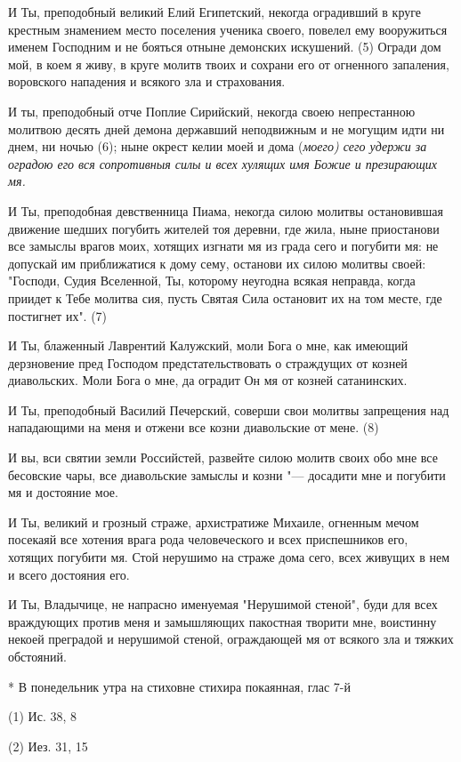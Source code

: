 И Ты, преподобный великий Елий Египетский, некогда оградивший в круге крестным знамением место поселения ученика своего, повелел ему вооружиться именем Господним и не бояться отныне демонских искушений. (5) Огради дом мой, в коем я живу, в круге молитв твоих и сохрани его от огненного запаления, воровского нападения и всякого зла и страхования.


И ты, преподобный отче Поплие Сирийский, некогда своею непрестанною молитвою десять дней демона державший неподвижным и не могущим идти ни днем, ни ночью (6); ныне окрест келии моей и дома (\itshape моего\normalfont{}) сего удержи за оградою его вся сопротивныя силы и всех хулящих имя Божие и презирающих мя.


И Ты, преподобная девственница Пиама, некогда силою молитвы остановившая движение шедших погубить жителей тоя деревни, где жила, ныне приостанови все замыслы врагов моих, хотящих изгнати мя из града сего и погубити мя: не допускай им приближатися к дому сему, останови их силою молитвы своей: "Господи, Судия Вселенной, Ты, которому неугодна всякая неправда, когда приидет к Тебе молитва сия, пусть Святая Сила остановит их на том месте, где постигнет их". (7)


И Ты, блаженный Лаврентий Калужский, моли Бога о мне, как имеющий дерзновение пред Господом предстательствовать о страждущих от козней диавольских. Моли Бога о мне, да оградит Он мя от козней сатанинских.


И Ты, преподобный Василий Печерский, соверши свои молитвы запрещения над нападающими на меня и отжени все козни диавольские от мене. (8)


И вы, вси святии земли Российстей, развейте силою молитв своих обо мне все бесовские чары, все диавольские замыслы и козни "--- досадити мне и погубити мя и достояние мое.


И Ты, великий и грозный страже, архистратиже Михаиле, огненным мечом посекаяй все хотения врага рода человеческого и всех приспешников его, хотящих погубити мя. Стой нерушимо на страже дома сего, всех живущих в нем и всего достояния его.


И Ты, Владычице, не напрасно именуемая "Нерушимой стеной", буди для всех враждующих против меня и замышляющих пакостная творити мне, воистинну некоей преградой и нерушимой стеной, ограждающей мя от всякого зла и тяжких обстояний.


* В понедельник утра на стиховне стихира покаянная, глас 7-й

(1) Ис. 38, 8

(2) Иез. 31, 15

